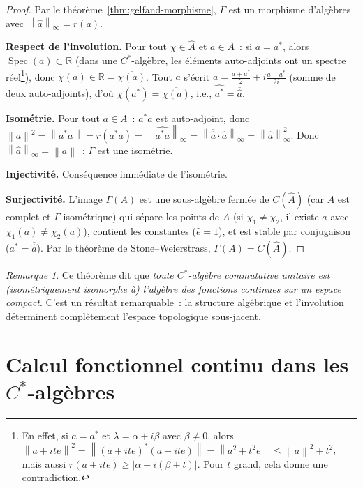\documentclass[a4paper,12pt]{book}
\DeclareMathOperator{\Spec}{Spec}
\newcommand{\R}{\mathbb{R}}
\newcommand{\norm}[1]{\left\| #1 \right\|}
\newcommand{\abs}[1]{\left| #1 \right|}
\theoremstyle{definition}
\theoremstyle{plain}
\theoremstyle{remark}
\newtheorem{remarque}[definition]{Remarque}
\begin{document}
\begin{proof}
Par le théorème~\ref{thm:gelfand-morphisme}, $\Gamma$ est un morphisme d'algèbres avec
$\norm{\hat a}_\infty = r(a)$.

\textbf{Respect de l'involution.} Pour tout $\chi \in \hat A$ et $a \in A$~: si $a = a^*$,
alors $\Spec(a) \subset \R$ (dans une $C^*$-algèbre, les éléments auto-adjoints ont un
spectre réel\footnote{En effet, si $a = a^*$ et $\lambda = \alpha + i\beta$ avec
$\beta \neq 0$, alors $\norm{a + it e}^2 = \norm{(a+ite)^*(a+ite)} = \norm{a^2 + t^2 e} \le \norm{a}^2 + t^2$, mais aussi $r(a+ite) \ge \abs{\alpha + i(\beta + t)}$. Pour $t$ grand, cela donne une contradiction.}),
donc $\chi(a) \in \R = \overline{\chi(a)}$. Tout $a$ s'écrit
$a = \frac{a+a^*}{2} + i\frac{a - a^*}{2i}$ (somme de deux auto-adjoints), d'où
$\chi(a^*) = \overline{\chi(a)}$, i.e., $\widehat{a^*} = \overline{\hat a}$.

\textbf{Isométrie.} Pour tout $a \in A$~: $a^*a$ est auto-adjoint, donc
$\norm{a}^2 = \norm{a^*a} = r(a^*a) = \norm{\widehat{a^*a}}_\infty = \norm{\overline{\hat a}\cdot\hat a}_\infty = \norm{\hat a}_\infty^2$.
Donc $\norm{\hat a}_\infty = \norm{a}$~: $\Gamma$ est une isométrie.

\textbf{Injectivité.} Conséquence immédiate de l'isométrie.

\textbf{Surjectivité.} L'image $\Gamma(A)$ est une sous-algèbre fermée de $C(\hat A)$
(car $A$ est complet et $\Gamma$ isométrique) qui sépare les points de $\hat A$ (si
$\chi_1 \neq \chi_2$, il existe $a$ avec $\chi_1(a) \neq \chi_2(a)$), contient les
constantes ($\hat e = 1$), et est stable par conjugaison ($\widehat{a^*} = \overline{\hat a}$).
Par le théorème de Stone--Weierstrass,
$\Gamma(A) = C(\hat A)$.
\end{proof}

\begin{remarque}
Ce théorème dit que \emph{toute $C^*$-algèbre commutative unitaire est (isométriquement
isomorphe à) l'algèbre des fonctions continues sur un espace compact}. C'est un résultat
remarquable~: la structure algébrique et l'involution déterminent complètement l'espace
topologique sous-jacent.
\end{remarque}

\section{Calcul fonctionnel continu dans les $C^*$-algèbres}
\end{document}
